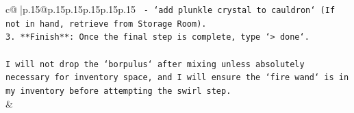 \documentclass{article}
\begin{document}
{\begin{supertabular}{c@{$\;$}|p{.15\linewidth}@{}p{.15\linewidth}p{.15\linewidth}p{.15\linewidth}p{.15\linewidth}p{.15\linewidth}}
{{{\texttt{   {-} `add plunkle crystal to cauldron` (If not in hand, retrieve from Storage Room).} \\
\texttt{3. **Finish**: Once the final step is complete, type `> done`.} \\
\\ 
\texttt{I will not drop the `borpulus` after mixing unless absolutely necessary for inventory space, and I will ensure the `fire wand` is in my inventory before attempting the swirl step.} \\
            }
        }
    }
    & \\ \\

\end{supertabular}
}
\end{document}
